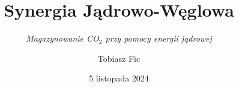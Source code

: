 

\title{Synergia Jądrowo-Węglowa}
    \subtitle{\textit{Magazynowanie CO$_2$ przy pomocy energii jądrowej}}
\author[T. Fic]{Tobiasz Fic}

\date{5 listopada 2024}



\begin{frame}
    \maketitle
\end{frame}










